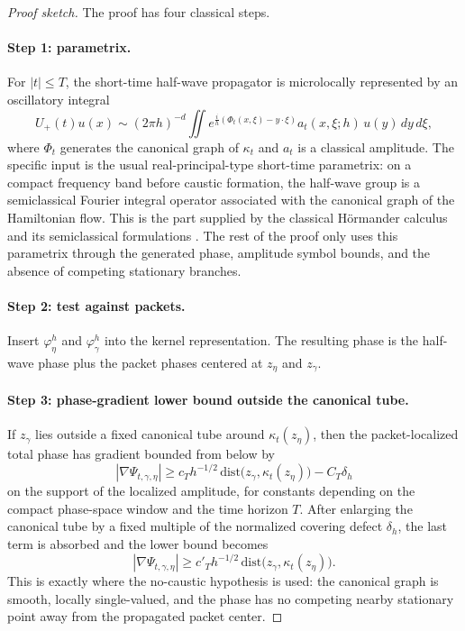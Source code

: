 \begin{proof}[Proof sketch]
The proof has four classical steps.

\paragraph{Step 1: parametrix.}
For $|t|\le T$, the short-time half-wave propagator is microlocally represented by an oscillatory integral
\[
U_+(t)u(x)
\sim
(2\pi h)^{-d}\iint
e^{\frac{i}{h}(\Phi_t(x,\xi)-y\cdot\xi)}
a_t(x,\xi;h)\,u(y)\,dy\,d\xi,
\]
where $\Phi_t$ generates the canonical graph of $\kappa_t$ and $a_t$ is a classical amplitude. The specific input is the usual real-principal-type short-time parametrix: on a compact frequency band before caustic formation, the half-wave group is a semiclassical Fourier integral operator associated with the canonical graph of the Hamiltonian flow. This is the part supplied by the classical H\"ormander calculus and its semiclassical formulations \citep{hormander1985analysis3,hormander1985analysis4,zworski2012semiclassical,alazardmicrolocal}. The rest of the proof only uses this parametrix through the generated phase, amplitude symbol bounds, and the absence of competing stationary branches.

\paragraph{Step 2: test against packets.}
Insert $\varphi_\eta^h$ and $\varphi_\gamma^h$ into the kernel representation. The resulting phase is the half-wave phase plus the packet phases centered at $z_\eta$ and $z_\gamma$.

\paragraph{Step 3: phase-gradient lower bound outside the canonical tube.}
If $z_\gamma$ lies outside a fixed canonical tube around $\kappa_t(z_\eta)$, then the packet-localized total phase has gradient bounded from below by
\[
|\nabla\Psi_{t,\gamma,\eta}|
\ge
c_T h^{-1/2}\,\mathrm{dist}\bigl(z_\gamma,\kappa_t(z_\eta)\bigr)-C_T\delta_h
\]
on the support of the localized amplitude, for constants depending on the compact phase-space window and the time horizon $T$. After enlarging the canonical tube by a fixed multiple of the normalized covering defect $\delta_h$, the last term is absorbed and the lower bound becomes
\[
|\nabla\Psi_{t,\gamma,\eta}|
\ge
c'_T h^{-1/2}\,\mathrm{dist}\bigl(z_\gamma,\kappa_t(z_\eta)\bigr).
\]
This is exactly where the no-caustic hypothesis is used: the canonical graph is smooth, locally single-valued, and the phase has no competing nearby stationary point away from the propagated packet center.


\end{proof}
